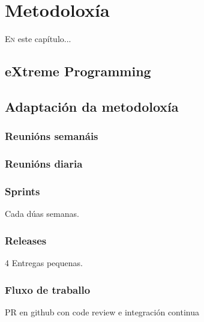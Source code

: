 \chapter{Metodoloxía}
\minitoc
\label{chap:Metodoloxia}
\vspace{0.5cm}


  \lettrine{E}{n} este capítulo...

  \section{eXtreme Programming}

  \section{Adaptación da metodoloxía}
    \subsection{Reunións semanáis}
    
    \subsection{Reunións diaria}
    
    \subsection{Sprints}
    Cada dúas semanas.

    \subsection{Releases}
    4 Entregas pequenas.

    \subsection{Fluxo de traballo}
    PR en github con code review e integración continua
